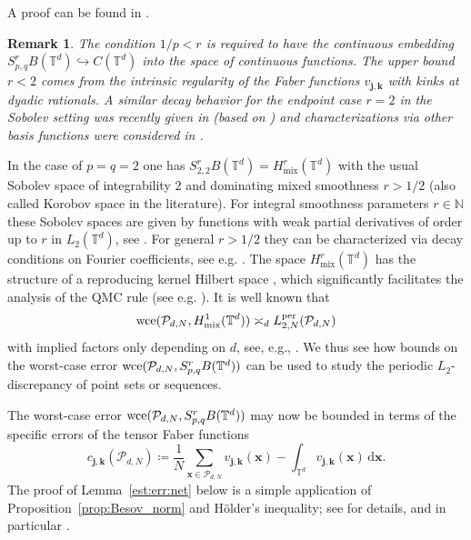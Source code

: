 \documentclass[12pt, a4paper]{article}
\newtheorem{rem}[thm]{Remark}
\def\P{\mathcal{P}}
\newcommand{\wce}{{\rm wce}}
\newcommand{\bsx}{{\boldsymbol{x}}}
\newcommand{\bsj}{{\boldsymbol{j}}}
\newcommand{\bsk}{{\boldsymbol{k}}}
\newcommand{\calP}{{\mathcal{P}}}
\newcommand{\bbT}{{\mathbb{T}}}
\newcommand{\bbN}{{\mathbb{N}}}
\begin{document}
A proof can be found in \cite[Proposition~3.4 and 3.5]{HMOU}.

\begin{rem}\rm
The condition $1/p < r$ is required to have the continuous embedding $S_{p, q}^rB(\mathbb T^d) \hookrightarrow C(\mathbb T^d)$ into the space of continuous functions. The upper bound $r < 2$ comes from the intrinsic regularity of the Faber functions $v_{\bsj, \bsk}$ with kinks at dyadic rationals. A similar decay behavior for the endpoint case $r=2$ in the Sobolev setting was recently given in \cite{KNU} (based on \cite{BG}) and characterizations via other basis functions were considered in \cite{SU}.
\end{rem}

In the case of $p=q=2$ one has $S_{2, 2}^rB(\mathbb T^d) = H_{\text{mix}}^r(\mathbb T^d)$ with the usual Sobolev space of integrability $2$ and dominating mixed smoothness $r > 1/2$ (also called Korobov space in the literature). For integral smoothness parameters $r \in \bbN$ these Sobolev spaces are given by functions with weak partial derivatives of order up to $r$ in $L_2(\mathbb T^d)$, see \cite{DTU}. For general $r > 1/2$ they can be characterized via decay conditions on Fourier coefficients, see e.g. \cite{D07}. The space $H_{\text{mix}}^r(\mathbb T^d)$ has the structure of a reproducing kernel Hilbert space \cite{BT}, which significantly facilitates the analysis of the QMC rule (see e.g. \cite{D07,DP10}). It is well known that
\begin{align} \label{eq:wce_lper}
    \wce(\calP_{d, N}, H_{\text{mix}}^1(\mathbb T^d)) \asymp_d L_{2,N}^{{\rm per}}(\P_{d,N})
\end{align}
with implied factors only depending on $d$, see, e.g., \cite{HKP20, HOe}. We thus see how bounds on the worst-case error $\wce(\calP_{d, N}, S_{p, q}^rB(\mathbb T^d))$ can be used to study the periodic $L_2$-discrepancy of point sets or sequences.

The worst-case error $\wce(\calP_{d, N}, S_{p, q}^rB(\mathbb T^d))$ may now be bounded in terms of the specific errors of the tensor Faber functions
\begin{equation}\label{def:cjk}
c_{\bsj, \bsk}(\calP_{d, N}) \coloneqq \frac1N \sum_{\bsx \in \calP_{d, N}} v_{\bsj, \bsk}(\bsx) - \int_{\bbT^d} v_{\bsj, \bsk}(\bsx) \, \mathrm d\bsx.
\end{equation}
The proof of Lemma~\ref{est:err:net} below is a simple application of Proposition~\ref{prop:Besov_norm} and H\"older's inequality; see \cite[Proof of Theorem~5.3]{HMOU} for details, and in particular \cite[Equation~(5.8)]{HMOU}.
\end{document}

